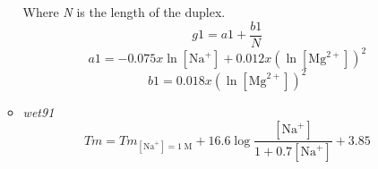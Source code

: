 \documentclass{article}
\begin{document}
\begin{itemize}
\begin{itemize}
 Where \emph{N} is the length of the duplex.
 \begin{displaymath}
  g1=a1 + \frac{b1}{N}  
 \end{displaymath}
 \begin{displaymath}
  a1= -0.075 x \ln [\mbox{Na}^+] + 0.012 x (\ln [\mbox{Mg}^{2+}])^2  
 \end{displaymath}
 \begin{displaymath}
  b1= 0.018 x (\ln [\mbox{Mg}^{2+}])^2  
 \end{displaymath}
 \item \textit{wet91}
 \begin{displaymath}
  Tm=Tm_{[\mbox{Na}^+]=1\;\mathrm{M}}+ 16.6  \log \frac{[\mbox{Na}^+]}{1 + 0.7 [\mbox{Na}^+]} + 3.85    
 \end{displaymath}
 \end{itemize}
 

\end{itemize}
\end{document}
